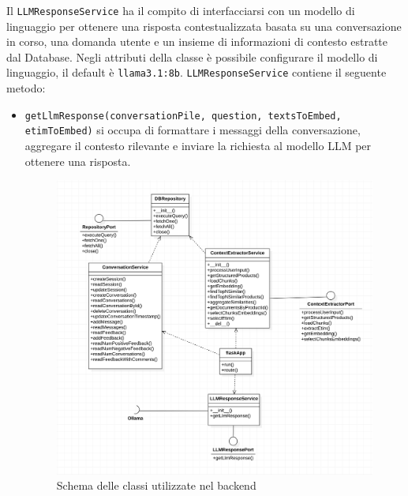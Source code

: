 Il \texttt{LLMResponseService} ha il compito di interfacciarsi con un modello di linguaggio per ottenere una risposta contestualizzata basata su una conversazione in corso, una domanda utente e un insieme di informazioni di contesto estratte dal Database.
Negli attributi della classe \`e possibile configurare il modello di linguaggio, il default \`e \texttt{llama3.1:8b}.
\texttt{LLMResponseService} contiene il seguente metodo:
\begin{itemize}
    \item \texttt{getLlmResponse(conversationPile, question, textsToEmbed, etimToEmbed)} si occupa di formattare i messaggi della conversazione, aggregare il contesto rilevante e inviare la richiesta al modello LLM per ottenere una risposta.
\begin{figure}[H]
    \centering
    \includegraphics[width=\textwidth]{images/BackendUML.png}
    \caption{Schema delle classi utilizzate nel backend}
    \label{fig:architettura}
\end{figure}

\end{itemize}

